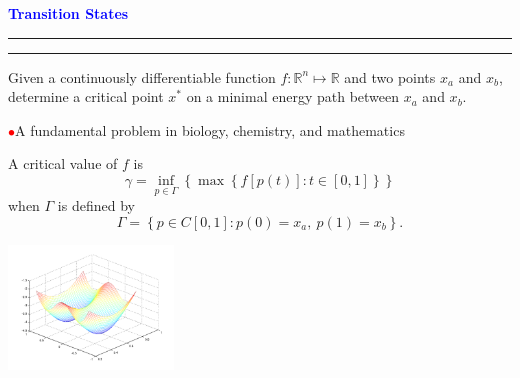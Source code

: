 \documentclass{seminar}
\newcommand{\R}{\mbox{${\mathbb R}$}}
\newcommand{\redball}{\textcolor{red}{$\bullet$}}
\newcommand{\redstripe}{\textcolor{red}{\hrule height 2.0pt\hfil}
             \vspace{-1.8pt}
             \textcolor{red}{\hrule height 1.0pt\hfil}
}
\newcommand{\heading}[1]{%
   \centerline{\textcolor{blue}{\textbf{#1}}}%
    \redstripe%
    \bigskip
}
\begin{document}
\begin{slide}

\heading{Transition States}

Given a continuously differentiable function  $ f : \R^n \mapsto \R $ 
and two points $ x_a $ and $ x_b $, 
determine a critical point $ x^* $
on a minimal energy path between $ x_a $ and $ x_b $.

\medskip

\redball \quad A fundamental problem in biology, chemistry, and mathematics

\bigskip

\begin{minipage}[b]{.60\linewidth}
\begin{small}
A critical value of $f$ is
\[
\gamma =  \inf_{p \in \Gamma} 
\left \{ \max \left \{ f[p(t)] : t \in [0,1] \right \} \right \} 
\]
when $ \Gamma $ is defined by
\[
\Gamma = \left \{ p \in C [0,1] : p(0) = x_a , \ p(1) = x_b \right \} .
\]
\end{small}
\end{minipage} 
\hfil
\begin{minipage}[b]{.35\linewidth}
\ifpdf
\includegraphics[height=1.3in]{../images/gaussian}
\else
\fi
\end{minipage}

\vfill

\end{slide}
\end{document}
